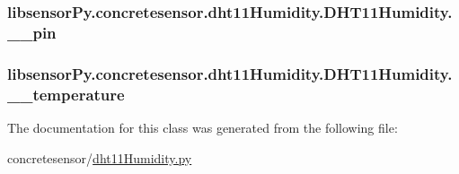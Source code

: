 \subsubsection[{\+\_\+\+\_\+pin}]{\setlength{\rightskip}{0pt plus 5cm}libsensor\+Py.\+concretesensor.\+dht11\+Humidity.\+D\+H\+T11\+Humidity.\+\_\+\+\_\+pin\hspace{0.3cm}{\ttfamily [private]}}\label{classlibsensorPy_1_1concretesensor_1_1dht11Humidity_1_1DHT11Humidity_a1d35a5fe848bdc3654d64802a330a866}
\hypertarget{classlibsensorPy_1_1concretesensor_1_1dht11Humidity_1_1DHT11Humidity_ad412769aa962049978739297a40d2c88}{}
\subsubsection[{\+\_\+\+\_\+temperature}]{\setlength{\rightskip}{0pt plus 5cm}libsensor\+Py.\+concretesensor.\+dht11\+Humidity.\+D\+H\+T11\+Humidity.\+\_\+\+\_\+temperature\hspace{0.3cm}{\ttfamily [private]}}\label{classlibsensorPy_1_1concretesensor_1_1dht11Humidity_1_1DHT11Humidity_ad412769aa962049978739297a40d2c88}


The documentation for this class was generated from the following file\+:\begin{DoxyCompactItemize}
\item 
concretesensor/\hyperlink{concretesensor_2dht11Humidity_8py}{dht11\+Humidity.\+py}\end{DoxyCompactItemize}
